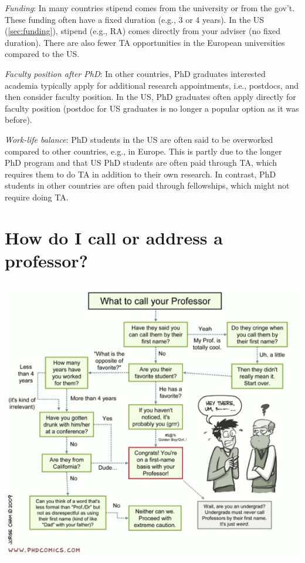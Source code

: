 \documentclass[oneside,11pt,dvipsnames]{book}
\begin{document}
\emph{Funding}:  In many countries stipend comes from the university or from the gov't. These funding often have a fixed duration (e.g., 3 or 4 years).  In the US (\autoref{sec:funding}), stipend (e.g., RA) comes directly from your adviser (no fixed duration).  There are also fewer TA opportunities in the European universities compared to the US.

\emph{Faculty position after PhD}: In other countries, PhD graduates interested academia typically apply for additional research appointments, i.e., postdocs, and then consider faculty position. In the US, PhD graduates often apply directly for faculty position (postdoc for US graduates is no longer a popular option as it was before).  %

\emph{Work-life balance}: PhD students in the US are often said to be overworked compared to other countries, e.g., in Europe.  This is partly due to the longer PhD program and that US PhD students are often paid through TA, which requires them to do TA in addition to their own research. In contrast, PhD students in other countries are often paid through fellowships, which might not require doing TA.



\section{How do I call or address a professor?}\label{sec:address}

\begin{center}
  \includegraphics[scale=0.5]{files/c5.png}
\end{center}
\end{document}
